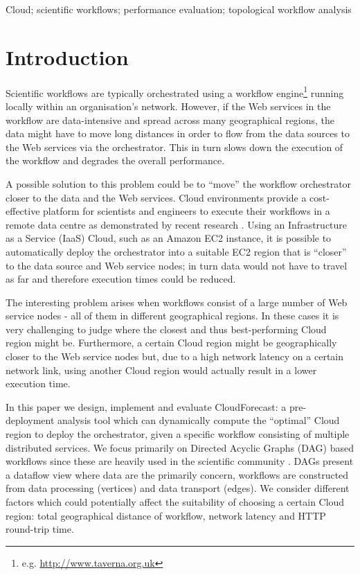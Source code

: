 \documentclass[10pt, conference, compsocconf]{IEEEtran}
\newcommand{\sysname}{CloudForecast\xspace}
\begin{document}
\begin{IEEEkeywords}
Cloud; scientific workflows; performance evaluation; topological workflow analysis
\end{IEEEkeywords}


\IEEEpeerreviewmaketitle


\section{Introduction}
Scientific workflows \cite{ppam08} are typically orchestrated using a workflow engine\footnote{e.g. \url{http://www.taverna.org.uk}} running locally within an organisation's network. However, if the Web services in the workflow are data-intensive and spread across many geographical regions, the data might have to move long distances in order to flow from the data sources to the Web services via the orchestrator. This in turn slows down the execution of the workflow and degrades the overall performance.


A possible solution to this problem could be to ``move'' the workflow orchestrator closer to the data and the Web services. Cloud environments provide a cost-effective platform for scientists and engineers to execute their workflows in a remote data centre as demonstrated by recent research \cite{deelman_EC2, deelman_workflow, trident_cloud, cost_cloud, cloud_hpc}. Using an Infrastructure as a Service (IaaS) Cloud, such as an Amazon EC2 instance, it is possible to automatically deploy the orchestrator into a suitable EC2 region that is ``closer'' to the data source and Web service nodes; in turn data would not have to travel as far and therefore execution times could be reduced.

The interesting problem arises when workflows consist of a large number of Web service nodes - all of them in different geographical regions. In these cases it is very challenging to judge where the closest and thus best-performing Cloud region might be. Furthermore, a certain Cloud region might be geographically closer to the Web service nodes but, due to a high network latency on a certain network link, using another Cloud region would actually result in a lower execution time.

In this paper we design, implement and evaluate \sysname: a pre-deployment analysis tool which can dynamically compute the ``optimal'' Cloud region to deploy the orchestrator, given a specific workflow consisting of multiple distributed services. We focus primarily on Directed Acyclic Graphs (DAG) based workflows since these are heavily used in the scientific community \cite{cite3}. DAGs present a dataflow view where data are the primarily concern, workflows are constructed from data processing (vertices) and data transport (edges). We consider different factors which could potentially affect the suitability of choosing a certain Cloud region: total geographical distance of workflow, network latency and HTTP round-trip time.
\end{document}
